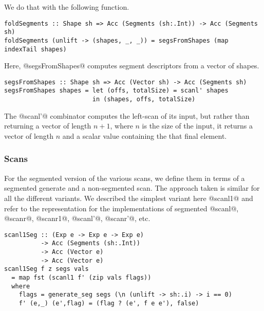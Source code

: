 %
We do that with the following function.
%
\begin{lstlisting}
foldSegments :: Shape sh => Acc (Segments (sh:.Int)) -> Acc (Segments sh)
foldSegments (unlift -> (shapes, _, _)) = segsFromShapes (map indexTail shapes)
\end{lstlisting}
%
Here, @segsFromShapes@ computes segment descriptors from a vector of shapes.
%
\begin{lstlisting}
segsFromShapes :: Shape sh => Acc (Vector sh) -> Acc (Segments sh)
segsFromShapes shapes = let (offs, totalSize) = scanl' shapes
                        in (shapes, offs, totalSize)
\end{lstlisting}
%
The @scanl'@ combinator computes the left-scan of its input, but rather than returning a vector of length $n+1$, where $n$ is the size of the input, it returns a vector of length $n$ and a scalar value containing the that final element.

\subsubsection{Scans}

For the segmented version of the various scans, we define them in terms of a segmented generate and a non-segmented scan. The approach taken is similar for all the different variants. We described the simplest variant here @scanl1@ and refer to the representation for the implementations of segmented @scanl@, @scanr@, @scanr1@, @scanl'@, @scanr'@, etc.
%
\begin{lstlisting}
scanl1Seg :: (Exp e -> Exp e -> Exp e)
          -> Acc (Segments (sh:.Int))
          -> Acc (Vector e)
          -> Acc (Vector e)
scanl1Seg f z segs vals
  = map fst (scanl1 f' (zip vals flags))
  where
    flags = generate_seg segs (\n (unlift -> sh:.i) -> i == 0)
    f' (e,_) (e',flag) = (flag ? (e', f e e'), false)
\end{lstlisting}
%

